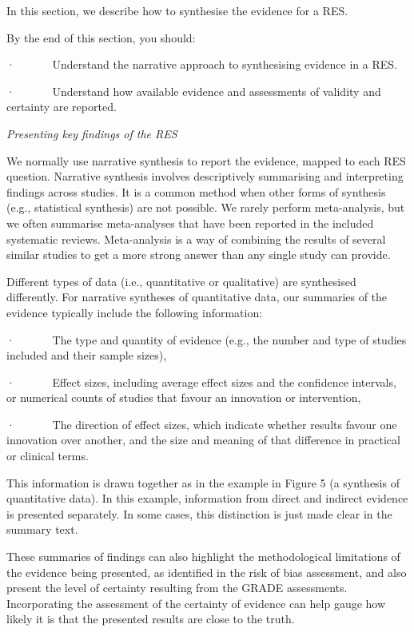 \documentclass[
  letterpaper,
  DIV=11,
  numbers=noendperiod]{scrreprt}
\begin{document}
In this section, we describe how to synthesise the evidence for a RES.

By the end of this section, you should:

·~~~~~~ Understand the narrative approach to synthesising evidence in a
RES.

·~~~~~~ Understand how available evidence and assessments of validity
and certainty are reported.

\emph{Presenting key findings of the RES}

We normally use narrative synthesis to report the evidence, mapped to
each RES question. Narrative synthesis involves descriptively
summarising and interpreting findings across studies. It is a common
method when other forms of synthesis (e.g., statistical synthesis) are
not possible. We rarely perform meta-analysis, but we often summarise
meta-analyses that have been reported in the included systematic
reviews. Meta-analysis is a way of combining the results of several
similar studies to get a more strong answer than any single study can
provide.

Different types of data (i.e., quantitative or qualitative) are
synthesised differently. For narrative syntheses of quantitative data,
our summaries of the evidence typically include the following
information:

·~~~~~~ The type and quantity of evidence (e.g., the number and type of
studies included and their sample sizes),

·~~~~~~ Effect sizes, including average effect sizes and the confidence
intervals, or numerical counts of studies that favour an innovation or
intervention,

·~~~~~~ The direction of effect sizes, which indicate whether results
favour one innovation over another, and the size and meaning of that
difference in practical or clinical terms.

This information is drawn together as in the example in Figure 5 (a
synthesis of quantitative data). In this example, information from
direct and indirect evidence is presented separately. In some cases,
this distinction is just made clear in the summary text.

These summaries of findings can also highlight the methodological
limitations of the evidence being presented, as identified in the risk
of bias assessment, and also present the level of certainty resulting
from the GRADE assessments. Incorporating the assessment of the
certainty of evidence can help gauge how likely it is that the presented
results are close to the truth.
\end{document}
